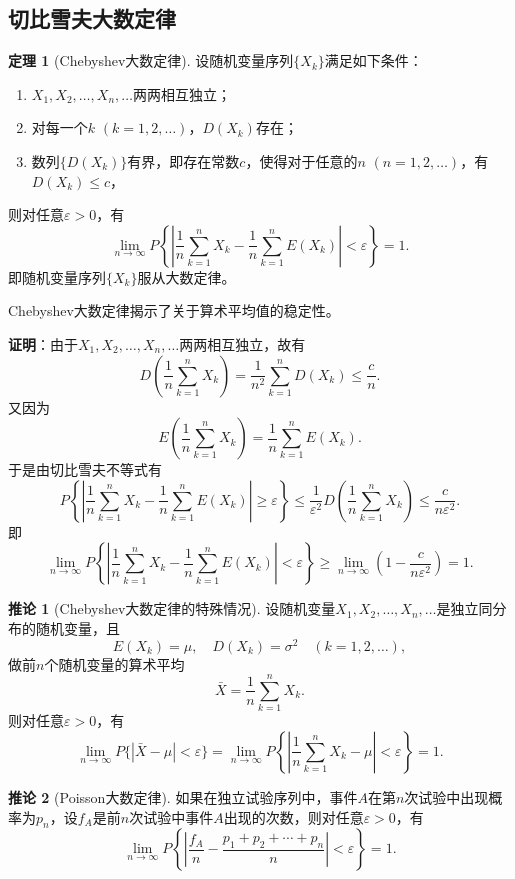 \documentclass[11pt,a4paper]{report}
\theoremstyle{definition}
\newtheorem{theorem}{定理}[chapter]
\newtheorem{corollary}{推论}[chapter]
\begin{document}
\subsection{切比雪夫大数定律}

\begin{theorem}[Chebyshev大数定律]
设随机变量序列$\{X_{k}\}$满足如下条件：
\begin{enumerate}[label=(\arabic*),leftmargin=2em]
    \item $X_{1},X_{2},\ldots,X_{n},\ldots$两两相互独立；
    \item 对每一个$k$ $(k=1,2,\ldots)$，$D(X_{k})$存在；
    \item 数列$\{D(X_{k})\}$有界，即存在常数$c$，使得对于任意的$n$ $(n=1,2,\ldots)$，有$D(X_{k})\leq c$，
\end{enumerate}
则对任意$\varepsilon>0$，有
\[
\lim_{n\to\infty}P\left\{\left|\frac{1}{n}\sum_{k=1}^{n}X_{k}-\frac{1}{n}\sum_{k=1}^{n}E(X_{k})\right|<\varepsilon\right\}=1.
\]
即随机变量序列$\{X_{k}\}$服从大数定律。
\end{theorem}

Chebyshev大数定律揭示了关于算术平均值的稳定性。

\textbf{证明}：由于$X_{1},X_{2},\ldots,X_{n},\ldots$两两相互独立，故有
\[
D\left(\frac{1}{n}\sum_{k=1}^{n}X_{k}\right)=\frac{1}{n^{2}}\sum_{k=1}^{n}D(X_{k})\leq\frac{c}{n}.
\]
又因为
\[
E\left(\frac{1}{n}\sum_{k=1}^{n}X_{k}\right)=\frac{1}{n}\sum_{k=1}^{n}E(X_{k}).
\]
于是由切比雪夫不等式有
\[
P\left\{\left|\frac{1}{n}\sum_{k=1}^{n}X_{k}-\frac{1}{n}\sum_{k=1}^{n}E(X_{k})\right|\geq\varepsilon\right\}\leq\frac{1}{\varepsilon^{2}}D\left(\frac{1}{n}\sum_{k=1}^{n}X_{k}\right)\leq\frac{c}{n\varepsilon^{2}}.
\]
即
\[
\lim_{n\to\infty}P\left\{\left|\frac{1}{n}\sum_{k=1}^{n}X_{k}-\frac{1}{n}\sum_{k=1}^{n}E(X_{k})\right|<\varepsilon\right\}\geq\lim_{n\to\infty}\left(1-\frac{c}{n\varepsilon^{2}}\right)=1.
\]

\begin{corollary}[Chebyshev大数定律的特殊情况]
设随机变量$X_{1},X_{2},\ldots,X_{n},\ldots$是独立同分布的随机变量，且
\[
E(X_{k})=\mu,\quad D(X_{k})=\sigma^{2}\quad(k=1,2,\ldots),
\]
做前$n$个随机变量的算术平均
\[
\bar{X}=\frac{1}{n}\sum_{k=1}^{n}X_{k}.
\]
则对任意$\varepsilon>0$，有
\[
\lim_{n\to\infty}P\{|\bar{X}-\mu|<\varepsilon\}=\lim_{n\to\infty}P\left\{\left|\frac{1}{n}\sum_{k=1}^{n}X_{k}-\mu\right|<\varepsilon\right\}=1.
\]
\end{corollary}

\begin{corollary}[Poisson大数定律]
如果在独立试验序列中，事件$A$在第$n$次试验中出现概率为$p_{n}$，设$f_{A}$是前$n$次试验中事件$A$出现的次数，则对任意$\varepsilon>0$，有
\[
\lim_{n\to\infty}P\left\{\left|\frac{f_{A}}{n}-\frac{p_{1}+p_{2}+\cdots+p_{n}}{n}\right|<\varepsilon\right\}=1.
\]
\end{corollary}
\end{document}
